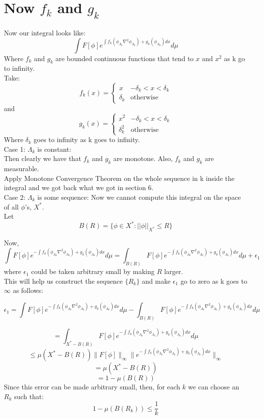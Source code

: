 \documentclass{article}
\theoremstyle{definition}
\begin{document}
\section{Now $f_k$ and $g_k$}
Now our integral looks like:
$$\int F[\phi]e^{\int f_k\left(\phi_{\Lambda_k} \nabla^2 \phi_{\Lambda_k}\right) + g_k\left(\phi_{\Lambda_k}\right) dx}d\mu$$
Where $f_k$ and $g_k$ are bounded continuous functions that tend to $x$ and $x^2$ as k go to infinity.\\
Take:
\[
f_k(x)=\begin{cases}
    x & -\delta_k < x < \delta_k\\
    \delta_k & \text{otherwise}
\end{cases}
\]
and
\[
g_k(x)=\begin{cases}
    x^2 & -\delta_k < x < \delta_k\\
    \delta_k^2 & \text{otherwise}
\end{cases}
\]
Where $\delta_k$ goes to infinity as k goes to infinity.\\
Case 1: $\Lambda_k$ is constant:\\
Then clearly we have that $f_k$ and $g_k$ are monotone. Also, $f_k$ and $g_k$ are measurable.\\
Apply Monotone Convergence Theorem on the whole sequence in k inside the integral and we got back what we got in section 6.\\
Case 2: $\Lambda_k$ is some sequence:
Now we cannot compute this integral on the space of all $\phi$'s, $X^*$.\\
Let 
\[
B(R) = \{\phi \in X^* : ||\phi||_{X^*} \leq R \}
\]

Now,
\[
\int F[\phi]e^{-\int f_k\left(\phi_{\Lambda_k} \nabla^2 \phi_{\Lambda_k}\right) + g_k\left(\phi_{\Lambda_k}\right) dx}d\mu = \int_{B(R)} F[\phi]e^{-\int f_k\left(\phi_{\Lambda_k} \nabla^2 \phi_{\Lambda_k}\right) + g_k\left(\phi_{\Lambda_k}\right) dx}d\mu + \epsilon_1
\] where $\epsilon_1$ could be taken arbitrary small by making $R$ larger.\\ 
This will help us construct the sequence $\{R_k\}$ and make $\epsilon_1$ go to zero as k goes to $\infty$ as follows:

\[
\epsilon_1=\int F[\phi]e^{-\int f_k\left(\phi_{\Lambda_k} \nabla^2 \phi_{\Lambda_k}\right) + g_k\left(\phi_{\Lambda_k}\right) dx}d\mu  - \int_{B(R)} F[\phi]e^{-\int f_k\left(\phi_{\Lambda_k} \nabla^2 \phi_{\Lambda_k}\right) + g_k\left(\phi_{\Lambda_k}\right) dx}d\mu 
\]

\[
= \int_{X^*-B(R)} F[\phi]e^{-\int f_k\left(\phi_{\Lambda_k} \nabla^2 \phi_{\Lambda_k}\right) + g_k\left(\phi_{\Lambda_k}\right) dx}d\mu 
\]
\[
\leq \mu(X^*-B(R)) \|F[\phi]\|_\infty \|e^{-\int f_k\left(\phi_{\Lambda_k} \nabla^2 \phi_{\Lambda_k}\right) + g_k\left(\phi_{\Lambda_k}\right) dx}\|_\infty
\]
\[
=\mu(X^*-B(R))
\]
\[
=1-\mu(B(R))
\]
Since this error can be made arbitrary small, then, for each $k$ we can choose an $R_k$ such that:
\[
1-\mu(B(R_k)) \leq \frac{1}{k}
\]
\end{document}
